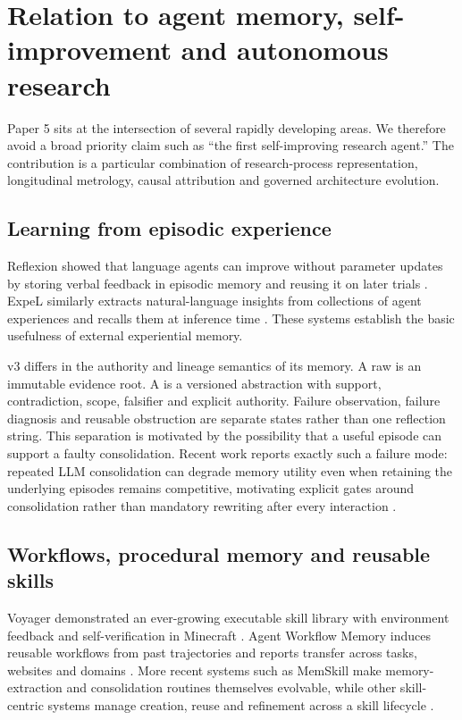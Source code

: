 \section{Relation to agent memory, self-improvement and autonomous research}
\label{sec:related}

Paper 5 sits at the intersection of several rapidly developing areas. We therefore avoid a broad priority claim such as ``the first self-improving research agent.'' The contribution is a particular combination of research-process representation, longitudinal metrology, causal attribution and governed architecture evolution.

\subsection{Learning from episodic experience}

Reflexion showed that language agents can improve without parameter updates by storing verbal feedback in episodic memory and reusing it on later trials \cite{shinn2023reflexion}. ExpeL similarly extracts natural-language insights from collections of agent experiences and recalls them at inference time \cite{zhao2023expel}. These systems establish the basic usefulness of external experiential memory.

\RAKL{} v3 differs in the authority and lineage semantics of its memory. A raw \TaskEpisode{} is an immutable evidence root. A \Lesson{} is a versioned abstraction with support, contradiction, scope, falsifier and explicit authority. Failure observation, failure diagnosis and reusable obstruction are separate states rather than one reflection string. This separation is motivated by the possibility that a useful episode can support a faulty consolidation. Recent work reports exactly such a failure mode: repeated LLM consolidation can degrade memory utility even when retaining the underlying episodes remains competitive, motivating explicit gates around consolidation rather than mandatory rewriting after every interaction \cite{zhang2026faultymemory}.

\subsection{Workflows, procedural memory and reusable skills}

Voyager demonstrated an ever-growing executable skill library with environment feedback and self-verification in Minecraft \cite{wang2023voyager}. Agent Workflow Memory induces reusable workflows from past trajectories and reports transfer across tasks, websites and domains \cite{wang2024awm}. More recent systems such as MemSkill make memory-extraction and consolidation routines themselves evolvable, while other skill-centric systems manage creation, reuse and refinement across a skill lifecycle \cite{zhang2026memskill,lin2026muse}.

